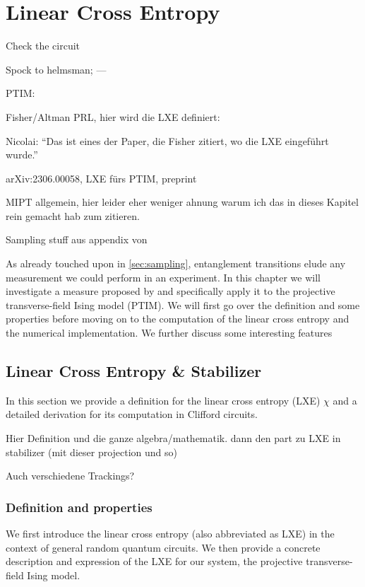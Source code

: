 \chapter{Linear Cross Entropy}
\label{ch:lxe}
\epigraph{Check the circuit}{Spock to helmsman;
--- }

PTIM: \cite{langEntanglementTransitionProjective2020}

Fisher/Altman PRL, hier wird die LXE definiert: \cite{liCrossEntropyBenchmark2023}

Nicolai: \enquote{Das ist eines der Paper, die Fisher zitiert, wo die LXE eingeführt wurde.} \cite{baoSymmetryEnrichedPhases2021}

arXiv:2306.00058, LXE fürs PTIM, preprint \cite{tikhanovskayaUniversalityCrossEntropy2023}

MIPT allgemein, hier leider eher weniger ahnung warum ich das in dieses Kapitel rein
gemacht hab zum zitieren. \cite{baoTheoryPhaseTransition2020}

Sampling stuff aus appendix von \cite{roserDecodingProjectiveTransverse2023}

As already touched upon in \cref{sec:sampling}, entanglement transitions elude
any measurement we could perform in an experiment. In this chapter we will
investigate a measure proposed by \citeauthor{liCrossEntropyBenchmark2023} and
specifically apply it to the projective transverse-field Ising model (PTIM). We
will first go over the definition and some properties before moving on to the
computation of the linear cross entropy and the numerical implementation. We
further discuss some interesting features
\section{Linear Cross Entropy \& Stabilizer}
In this section we provide a definition for the linear cross entropy (LXE)
$\chi$ and a detailed derivation for its computation in Clifford circuits.

Hier Definition und die ganze algebra/mathematik. dann den part zu LXE in
stabilizer (mit dieser projection und so)

Auch verschiedene Trackings?

\subsection{Definition and properties}
We first introduce the linear cross entropy (also abbreviated as LXE) in the
context of general random quantum circuits. We then provide a concrete
description and expression of the LXE for our system, the projective
transverse-field Ising model.

